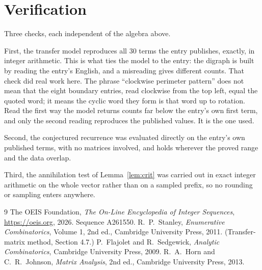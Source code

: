 \documentclass[11pt,a4paper]{article}
\theoremstyle{plain}
\theoremstyle{definition}
\begin{document}
\section{Verification}

Three checks, each independent of the algebra above.

First, the transfer model reproduces all $30$ terms the entry publishes, exactly, in
integer arithmetic. This is what ties the model to the entry: the digraph is built by reading
the entry's English, and a misreading gives different counts. That check did real work here. The phrase ``clockwise perimeter pattern'' does not mean that the eight boundary entries, read clockwise from the top left, equal the quoted word; it means the cyclic word they form is that word up to rotation. Read the first way the model returns counts far below the entry's own first term, and only the second reading reproduces the published values. It is the one used.

Second, the conjectured recurrence was evaluated directly on the entry's own published terms,
with no matrices involved, and holds wherever the proved range and the data overlap.

Third, the annihilation test of Lemma~\ref{lem:crit} was carried out in exact integer
arithmetic on the whole vector rather than on a sampled prefix, so no rounding or sampling
enters anywhere.

\begin{thebibliography}{9}
 The OEIS Foundation, \emph{The On-Line Encyclopedia of Integer
Sequences}, \url{https://oeis.org}, 2026. Sequence A261550.
 R.~P.~Stanley, \emph{Enumerative Combinatorics}, Volume 1, 2nd ed.,
Cambridge University Press, 2011. (Transfer-matrix method, Section 4.7.)
 P.~Flajolet and R.~Sedgewick, \emph{Analytic Combinatorics}, Cambridge
University Press, 2009.
 R.~A.~Horn and C.~R.~Johnson, \emph{Matrix Analysis}, 2nd ed., Cambridge
University Press, 2013.
\end{thebibliography}
\end{document}
